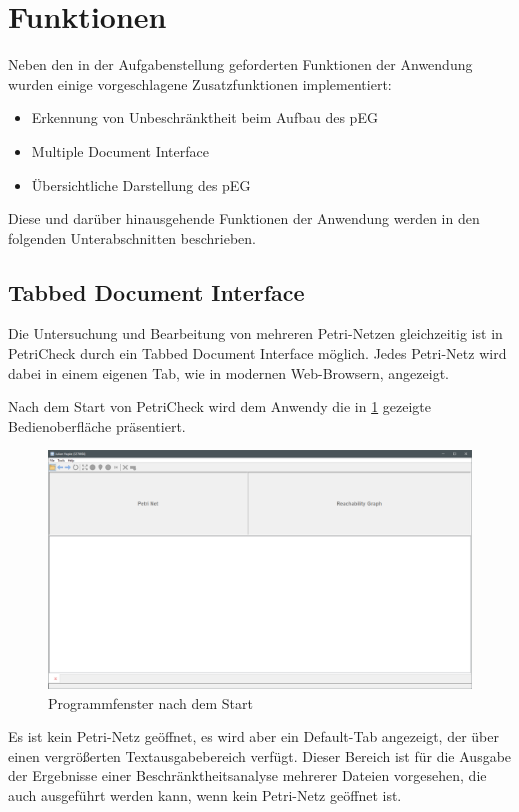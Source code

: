 \section{Funktionen}
Neben den in der Aufgabenstellung geforderten Funktionen der Anwendung wurden
einige vorgeschlagene Zusatzfunktionen implementiert:
\begin{itemize}
  \item Erkennung von Unbeschränktheit beim Aufbau des pEG
  \item Multiple Document Interface
  \item Übersichtliche Darstellung des pEG
\end{itemize}
Diese und darüber hinausgehende Funktionen der Anwendung werden in den folgenden
Unterabschnitten beschrieben.

\subsection{Tabbed Document Interface}
Die Untersuchung und Bearbeitung von mehreren Petri-Netzen gleichzeitig ist in
PetriCheck durch ein Tabbed Document Interface möglich. Jedes Petri-Netz wird
dabei in einem eigenen Tab, wie in modernen Web-Browsern, angezeigt.

Nach dem Start von PetriCheck wird dem Anwendy die in \cref{img:default_window}
gezeigte Bedienoberfläche präsentiert.

\begin{figure}[H]
  \includegraphics[width=\textwidth]{../img/default_window.png}
  \caption{Programmfenster nach dem Start}
  \label{img:default_window}
\end{figure}

Es ist kein Petri-Netz geöffnet, es wird aber ein Default-Tab angezeigt, der
über einen vergrößerten Textausgabebereich verfügt. Dieser Bereich ist für die
Ausgabe der Ergebnisse einer Beschränktheitsanalyse mehrerer Dateien vorgesehen,
die auch ausgeführt werden kann, wenn kein Petri-Netz geöffnet ist.


